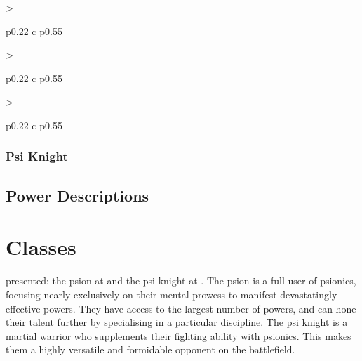 \DndSetThemeColor[DmgSlateGrey]
\begin{DndTable}[header=Metacreativity Sublist, bold=false]{
    >{\raggedright\arraybackslash}p{0.22\linewidth} c p{0.55\linewidth}}
    
\end{DndTable}

\DndSetThemeColor[DmgLilac]
\begin{DndTable}[header=Spacefolding Sublist, bold=false]{
    >{\raggedright\arraybackslash}p{0.22\linewidth} c p{0.55\linewidth}}
    
\end{DndTable}

\DndSetThemeColor[PhbLightGreen]
\begin{DndTable}[header=Psychokinesis Sublist, bold=false]{
    >{\raggedright\arraybackslash}p{0.22\linewidth} c p{0.55\linewidth}}
    
\end{DndTable}

\DndSetThemeColor[DmgCoral]
\subsection{Psi Knight}
\begin{dndlongtable}
    
\end{dndlongtable}

\DndSetThemeColor[PhbLightGreen]
\section{Power Descriptions}
\label{sec:power_descriptions}


\chapter{Classes}
\label{chap:classes}
presented: the psion at  and the psi knight at
.
The psion is a full user of psionics,
focusing nearly exclusively on their mental prowess
to manifest devastatingly effective powers.
They have access to the largest number of powers,
and can hone their talent further by specialising
in a particular discipline.
The psi knight is a martial warrior
who supplements their fighting ability with
psionics.
This makes them a highly versatile and formidable
opponent on the battlefield.

